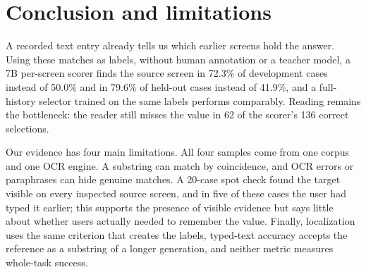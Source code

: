 \section{Conclusion and limitations}
A recorded text entry already tells us which earlier screens hold the answer. Using these matches as labels, without human annotation or a teacher model, a 7B per-screen scorer finds the source screen in 72.3\% of development cases instead of 50.0\% and in 79.6\% of held-out cases instead of 41.9\%, and a full-history selector trained on the same labels performs comparably. Reading remains the bottleneck: the reader still misses the value in 62 of the scorer's 136 correct selections.

Our evidence has four main limitations. All four samples come from one corpus and one OCR engine. A substring can match by coincidence, and OCR errors or paraphrases can hide genuine matches. A 20-case spot check found the target visible on every inspected source screen, and in five of these cases the user had typed it earlier; this supports the presence of visible evidence but says little about whether users actually needed to remember the value. Finally, localization uses the same criterion that creates the labels, typed-text accuracy accepts the reference as a substring of a longer generation, and neither metric measures whole-task success.

